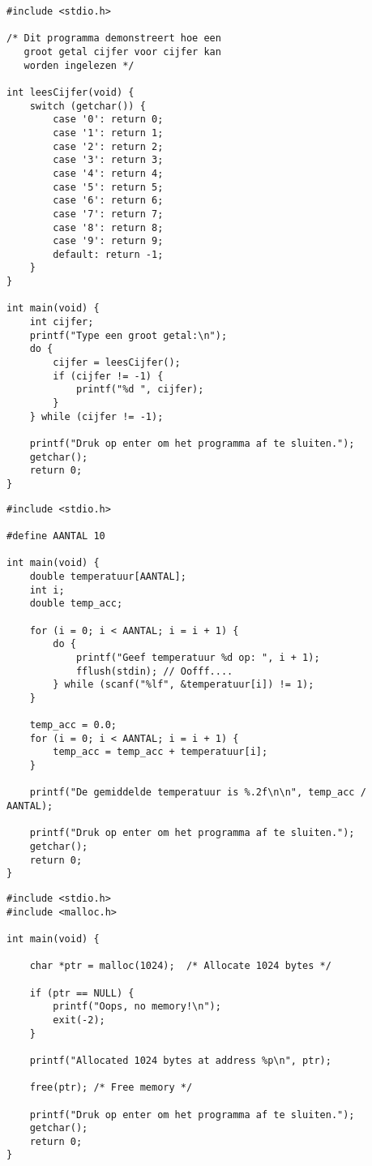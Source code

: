 \documentclass[a4paper,12pt]{article}
\begin{document}
\newpage

\begin{lstlisting}
#include <stdio.h>

/* Dit programma demonstreert hoe een
   groot getal cijfer voor cijfer kan
   worden ingelezen */

int leesCijfer(void) {
    switch (getchar()) {
        case '0': return 0;
        case '1': return 1;
        case '2': return 2;
        case '3': return 3;
        case '4': return 4;
        case '5': return 5;
        case '6': return 6;
        case '7': return 7;
        case '8': return 8;
        case '9': return 9;
        default: return -1;
    }
}

int main(void) {
    int cijfer;
    printf("Type een groot getal:\n");
    do {
        cijfer = leesCijfer();
        if (cijfer != -1) {
            printf("%d ", cijfer);
        }
    } while (cijfer != -1);
    
    printf("Druk op enter om het programma af te sluiten.");
    getchar();
    return 0;
}
\end{lstlisting}

\newpage

\begin{lstlisting}
#include <stdio.h>

#define AANTAL 10

int main(void) {
    double temperatuur[AANTAL];
    int i;
    double temp_acc;

    for (i = 0; i < AANTAL; i = i + 1) {
        do {
            printf("Geef temperatuur %d op: ", i + 1);
            fflush(stdin); // Oofff....
        } while (scanf("%lf", &temperatuur[i]) != 1);
    }

    temp_acc = 0.0;
    for (i = 0; i < AANTAL; i = i + 1) {
        temp_acc = temp_acc + temperatuur[i];
    }

    printf("De gemiddelde temperatuur is %.2f\n\n", temp_acc / AANTAL);

    printf("Druk op enter om het programma af te sluiten.");
    getchar();
    return 0;
}
\end{lstlisting}

\newpage

\begin{lstlisting}
#include <stdio.h>
#include <malloc.h>

int main(void) {

	char *ptr = malloc(1024);  /* Allocate 1024 bytes */

	if (ptr == NULL) {
		printf("Oops, no memory!\n");
		exit(-2);
	}

	printf("Allocated 1024 bytes at address %p\n", ptr);

	free(ptr); /* Free memory */

    printf("Druk op enter om het programma af te sluiten.");
    getchar();
	return 0;
}
\end{lstlisting}
\end{document}
